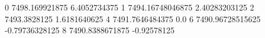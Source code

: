 0 7498.169921875 6.4052734375
1 7494.16748046875 2.40283203125
2 7493.3828125 1.6181640625
4 7491.7646484375 0.0
6 7490.96728515625 -0.79736328125
8 7490.8388671875 -0.92578125
